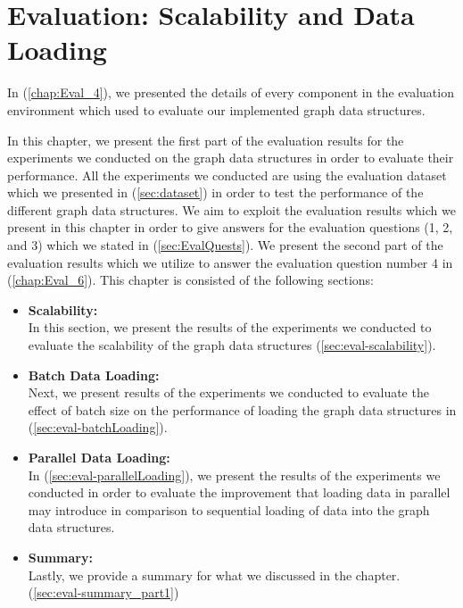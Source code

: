 {\chapter{Evaluation: Scalability and Data Loading}
\label{chap:Eval_5}


In (\ref{chap:Eval_4}), we presented the details of every component in the evaluation environment which used to evaluate our implemented graph data structures.

In this chapter, we present the first part of the evaluation results for the experiments we conducted on the graph data structures in order to evaluate their performance. All the experiments we conducted are using the evaluation dataset which we presented in (\ref{sec:dataset}) in order to test the performance of the different graph data structures. We aim to exploit the evaluation results which we present in this chapter in order to give answers for the evaluation questions (1, 2, and 3) which we stated in (\ref{sec:EvalQuests}). We present the second part of the evaluation results which we utilize to answer the evaluation question number 4 in (\ref{chap:Eval_6}). This chapter is consisted of the following sections:

\begin{itemize}  

\item \textbf{Scalability:}\\
In this section, we present the results of the experiments we conducted to evaluate the scalability of the graph data structures (\ref{sec:eval-scalability}).

\item \textbf{Batch Data Loading:}\\
Next, we present results of the experiments we conducted to evaluate the effect of batch size on the performance of loading the graph data structures in (\ref{sec:eval-batchLoading}).

\item \textbf{Parallel Data Loading:}\\
In (\ref{sec:eval-parallelLoading}), we present the results of the experiments we conducted in order to evaluate the improvement that loading data in parallel may introduce in comparison to sequential loading of data into the graph data structures.

\item \textbf{Summary:}\\
Lastly, we provide a summary for what we discussed in the chapter. (\ref{sec:eval-summary_part1})


\end{itemize}}

